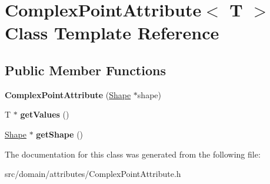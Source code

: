 \hypertarget{class_complex_point_attribute}{}\section{Complex\+Point\+Attribute$<$ T $>$ Class Template Reference}
\label{class_complex_point_attribute}
\subsection*{Public Member Functions}
\begin{DoxyCompactItemize}
\item 
\hypertarget{class_complex_point_attribute_adab6b6a27e00392fc6c9813a882b04c8}{}{\bfseries Complex\+Point\+Attribute} (\hyperlink{class_shape}{Shape} $\ast$shape)\label{class_complex_point_attribute_adab6b6a27e00392fc6c9813a882b04c8}

\item 
\hypertarget{class_complex_point_attribute_aaab75963a00adf77fbc0b01977e3362a}{}T $\ast$ {\bfseries get\+Values} ()\label{class_complex_point_attribute_aaab75963a00adf77fbc0b01977e3362a}

\item 
\hypertarget{class_complex_point_attribute_a4c173db22846017de47d7f0abf5cf0b7}{}\hyperlink{class_shape}{Shape} $\ast$ {\bfseries get\+Shape} ()\label{class_complex_point_attribute_a4c173db22846017de47d7f0abf5cf0b7}

\end{DoxyCompactItemize}


The documentation for this class was generated from the following file\+:\begin{DoxyCompactItemize}
\item 
src/domain/attributes/Complex\+Point\+Attribute.\+h\end{DoxyCompactItemize}
